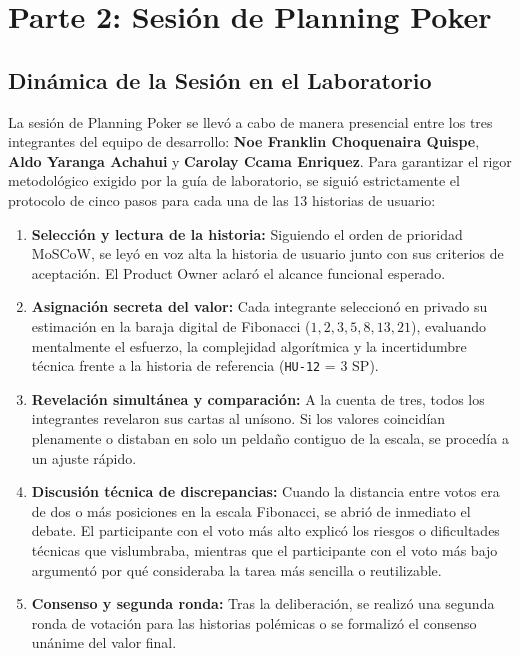 \section{Parte 2: Sesión de Planning Poker}

\subsection{Dinámica de la Sesión en el Laboratorio}

La sesión de Planning Poker se llevó a cabo de manera presencial entre los tres integrantes del equipo de desarrollo: \textbf{Noe Franklin Choquenaira Quispe}, \textbf{Aldo Yaranga Achahui} y \textbf{Carolay Ccama Enriquez}. Para garantizar el rigor metodológico exigido por la guía de laboratorio, se siguió estrictamente el protocolo de cinco pasos para cada una de las 13 historias de usuario:

\begin{enumerate}
    \item \textbf{Selección y lectura de la historia:} Siguiendo el orden de prioridad MoSCoW, se leyó en voz alta la historia de usuario junto con sus criterios de aceptación. El Product Owner aclaró el alcance funcional esperado.
    \item \textbf{Asignación secreta del valor:} Cada integrante seleccionó en privado su estimación en la baraja digital de Fibonacci ($1, 2, 3, 5, 8, 13, 21$), evaluando mentalmente el esfuerzo, la complejidad algorítmica y la incertidumbre técnica frente a la historia de referencia (\texttt{HU-12} = 3 SP).
    \item \textbf{Revelación simultánea y comparación:} A la cuenta de tres, todos los integrantes revelaron sus cartas al unísono. Si los valores coincidían plenamente o distaban en solo un peldaño contiguo de la escala, se procedía a un ajuste rápido.
    \item \textbf{Discusión técnica de discrepancias:} Cuando la distancia entre votos era de dos o más posiciones en la escala Fibonacci, se abrió de inmediato el debate. El participante con el voto más alto explicó los riesgos o dificultades técnicas que vislumbraba, mientras que el participante con el voto más bajo argumentó por qué consideraba la tarea más sencilla o reutilizable.
    \item \textbf{Consenso y segunda ronda:} Tras la deliberación, se realizó una segunda ronda de votación para las historias polémicas o se formalizó el consenso unánime del valor final.
\end{enumerate}

